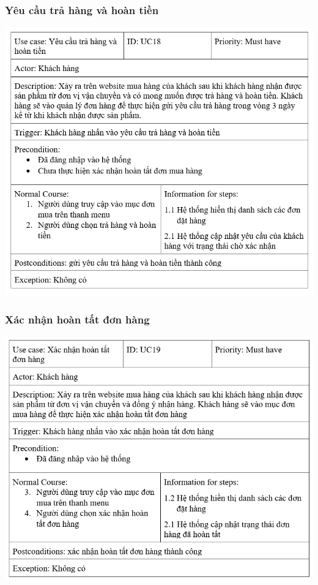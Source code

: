 \documentclass[12pt,a4paper,2sides]{report}
\begin{document}
\subsubsection{Yêu cầu trả hàng và hoàn tiền}
    \includegraphics[width=1\linewidth]{lib/usecase/yeucautrahang.png}\\\vspace*{1cm}    
\subsubsection{Xác nhận hoàn tất đơn hàng}
    \includegraphics[width=1\linewidth]{lib/usecase/xacnhanhoantatdh.png}\\\vspace*{1cm}    
\end{document}
